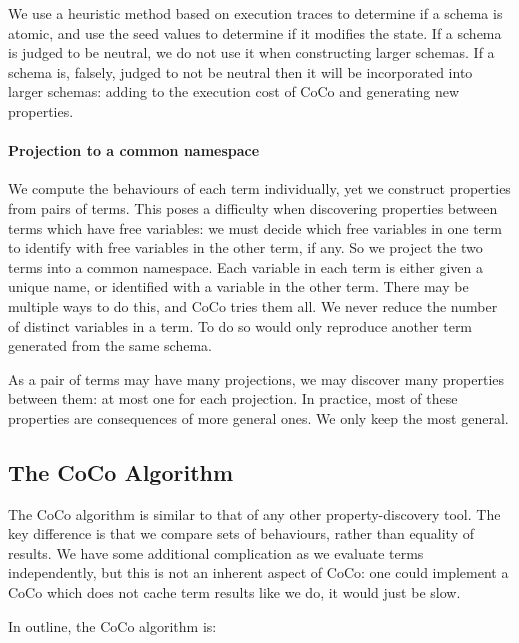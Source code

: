 We use a heuristic method based on execution traces to determine if a
schema is atomic, and use the seed values to determine if it modifies
the state.  If a schema is judged to be neutral, we do not use it when
constructing larger schemas.  If a schema is, falsely, judged to not
be neutral then it will be incorporated into larger schemas: adding to
the execution cost of CoCo and generating new properties.

\paragraph{Projection to a common namespace}
We compute the behaviours of each term individually, yet we construct
properties from pairs of terms.  This poses a difficulty when
discovering properties between terms which have free variables: we
must decide which free variables in one term to identify with free
variables in the other term, if any.  So we project the two terms into
a common namespace.  Each variable in each term is either given a
unique name, or identified with a variable in the other term.  There
may be multiple ways to do this, and CoCo tries them all.  We never
reduce the number of distinct variables in a term.  To do so would
only reproduce another term generated from the same schema.

As a pair of terms may have many projections, we may discover many
properties between them: at most one for each projection.  In
practice, most of these properties are consequences of more general
ones.  We only keep the most general.

\subsection{The CoCo Algorithm}
\label{sec:coco-hiw-algo}

The CoCo algorithm is similar to that of any other property-discovery
tool.  The key difference is that we compare sets of behaviours,
rather than equality of results.  We have some additional complication
as we evaluate terms independently, but this is not an inherent aspect
of CoCo: one could implement a CoCo which does not cache term results
like we do, it would just be slow.

In outline, the CoCo algorithm is:

